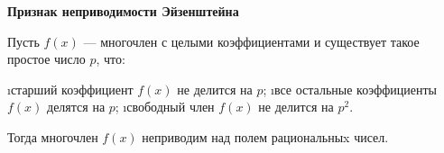 \begin{problem}[24(6.1)]
\bf{Признак неприводимости Эйзенштейна}

Пусть $f(x)$ --- многочлен с целыми коэффициентами и существует такое простое число $p$, что:

\begin{enumerate}
\i старший коэффициент $f(x)$ не делится на $p$;
\i все остальные коэффициенты $f(x)$ делятся на $p$;
\i свободный член $f(x)$ не делится на $p^2$.
\end{enumerate}
Тогда многочлен $f(x)$ неприводим над полем рациональныx чисел.
\end{problem}

\begin{solution}





\end{solution}
